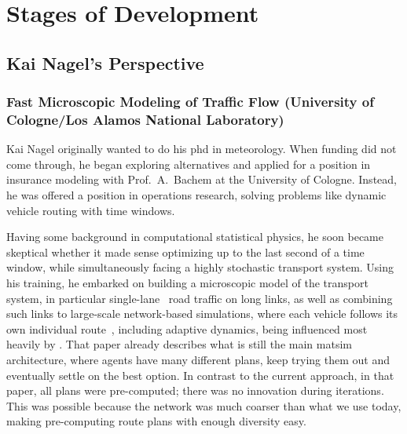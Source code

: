 \section{Stages of Development} %
\subsection{Kai Nagel's Perspective}

\subsubsection{Fast Microscopic Modeling of Traffic Flow (University of Cologne/Los Alamos National Laboratory)}
\label{sec:history-u-of-cologne-phase}

Kai Nagel originally wanted to do his \acrshort{phd} 
in meteorology.  When funding did not come through, he began exploring alternatives and applied for a position in insurance modeling with Prof.\ A.\ Bachem at the University of Cologne.  Instead, he was offered a position in operations research, solving problems like dynamic vehicle routing with time windows. 

Having some background in computational statistical physics, he soon became skeptical whether it made sense optimizing up to the last second of a time window, while simultaneously  facing a highly stochastic transport system.  Using his training, he embarked on building a microscopic model of the transport system, in particular single-lane~\citep{NagelSchreckenberg1992CA,Nagel1999flowTheoTrr} road traffic on long links, as well as combining such links to large-scale network-based simulations, where each vehicle follows its own individual route~\citep{Nagel1996NRW}, including adaptive dynamics, being influenced most heavily by \cite{ArthurBar}.  That paper already \citep{Nagel1996NRW} describes what is still the main \gls{matsim} architecture, where agents have many different plans, keep trying them out and eventually settle on the best option.  In contrast to the current approach, in that paper, all plans were pre-computed; \ie there was no innovation during iterations.  This was possible because the network was much coarser than what we use today, making pre-computing route plans with enough diversity easy.

